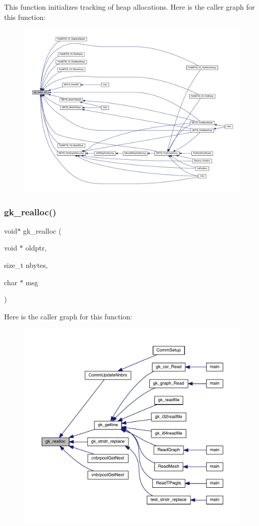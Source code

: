 This function initializes tracking of heap allocations. Here is the caller graph for this function\+:\nopagebreak
\begin{figure}[H]
\begin{center}
\leavevmode
\includegraphics[width=350pt]{a00110_a24633cc1c72a7e92836912c2adcf570a_icgraph}
\end{center}
\end{figure}
\mbox{\label{a00110_ab76a07ccd25288dd9acc99f5f24a7600}} 
\subsubsection{\texorpdfstring{gk\+\_\+realloc()}{gk\_realloc()}}
{\footnotesize\ttfamily void$\ast$ gk\+\_\+realloc (\begin{DoxyParamCaption}\item[{void $\ast$}]{oldptr,  }\item[{size\+\_\+t}]{nbytes,  }\item[{char $\ast$}]{msg }\end{DoxyParamCaption})}

Here is the caller graph for this function\+:\nopagebreak
\begin{figure}[H]
\begin{center}
\leavevmode
\includegraphics[width=350pt]{a00110_ab76a07ccd25288dd9acc99f5f24a7600_icgraph}
\end{center}
\end{figure}
